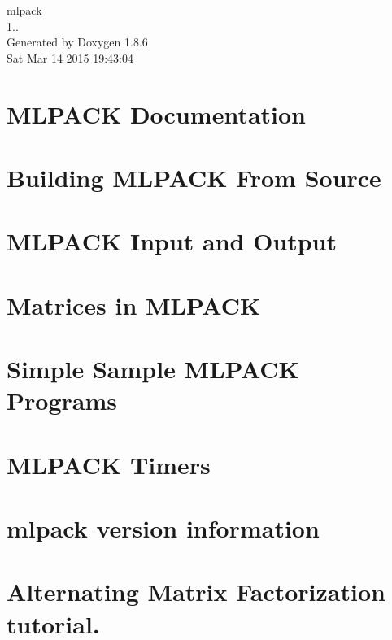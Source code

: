 \documentclass[twoside]{book}
\newcommand{\clearemptydoublepage}{%
  \newpage{\pagestyle{empty}\cleardoublepage}%
}
\begin{document}
\begin{titlepage}
\vspace*{7cm}
\begin{center}%
{\Large mlpack \\[1ex]\large 1.. }\\
\vspace*{1cm}
{\large Generated by Doxygen 1.8.6}\\
\vspace*{0.5cm}
{\small Sat Mar 14 2015 19:43:04}\\
\end{center}
\end{titlepage}
\clearemptydoublepage
\tableofcontents
\clearemptydoublepage
{}

\chapter{M\-L\-P\-A\-C\-K Documentation}
\label{index}
\chapter{Building M\-L\-P\-A\-C\-K From Source}
\label{build}

\chapter{M\-L\-P\-A\-C\-K Input and Output}
\label{iodoc}

\chapter{Matrices in M\-L\-P\-A\-C\-K}
\label{matrices}

\chapter{Simple Sample M\-L\-P\-A\-C\-K Programs}
\label{sample}

\chapter{M\-L\-P\-A\-C\-K Timers}
\label{timer}

\chapter{mlpack version information}
\label{verinfo}

\chapter{Alternating Matrix Factorization tutorial.}
\label{amftutorial}

\end{document}
